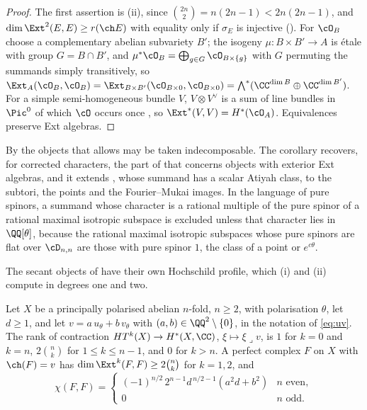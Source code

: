 \begin{proof}
The first assertion is (ii), since
$\binom{2n}{2}=n(2n-1)<2n(2n-1)$, and $\dim\Ext^{2}(E,E)\ge r(\ch E)$ with
equality only if $\sigma_{E}$ is injective (). For
$\cO_{B}$ choose a complementary abelian subvariety $B'$; the isogeny
$\mu\colon B\times B'\to A$ is \'etale with group $G=B\cap B'$, and
$\mu^{*}\cO_{B}=\bigoplus_{g\in G}\cO_{B\times\{g\}}$ with $G$ permuting the
summands simply transitively, so $\Ext_{A}(\cO_{B},\cO_{B})
=\Ext_{B\times B'}(\cO_{B\times0},\cO_{B\times0})=\bigwedge^{*}(\CC^{\dim B}
\oplus\CC^{\dim B'})$. For a simple semi-homogeneous bundle $V$,
$V\otimes V^{\vee}$ is a sum of line bundles in $\Pic^{0}$ of which $\cO$ occurs
once \cite{Muk78}, so $\Ext^{*}(V,V)=H^{*}(\cO_{A})$. Equivalences preserve
Ext algebras.
\end{proof}

By  the objects that 
allows may be taken indecomposable. The corollary recovers, for
corrected characters, the part of  that concerns objects with
exterior Ext algebras, and it extends , whose summand
has a scalar Atiyah class, to the subtori, the points and the Fourier--Mukai
images. In the language of pure spinors, a summand whose
character is a rational multiple of the pure spinor of a rational maximal
isotropic subspace is excluded unless that character lies in $\QQ[\theta]$,
because the rational maximal isotropic subspaces whose pure spinors are flat
over $\cD_{n,n}$ are those with pure spinor $1$, the class of a point or
$e^{c\theta}$.

The secant objects of  have their own Hochschild
profile, which (i) and (ii) compute in degrees one and two.

\begin{proposition}
\label{prop:secantprofile}
Let $X$ be a principally polarised abelian $n$-fold, $n\ge2$, with
polarisation $\theta$, let $d\ge1$, and let $v=a\,u_{\theta}+b\,v_{\theta}$
with $(a,b)\in\QQ^{2}\setminus\{0\}$, in the notation of \eqref{eq:uv}. The
rank of contraction $HT^{k}(X)\to H^{*}(X,\CC)$, $\xi\mapsto\xi\lrcorner v$, is
$1$ for $k=0$ and $k=n$, $2\binom{n}{k}$ for $1\le k\le n-1$, and $0$ for
$k>n$. A perfect complex $F$ on $X$ with $\ch(F)=v$ has
$\dim\Ext^{k}(F,F)\ge2\binom{n}{k}$ for $k=1,2$, and
\[
  \chi(F,F)=\begin{cases}
    (-1)^{n/2}\,2^{n-1}d^{\,n/2-1}(a^{2}d+b^{2}) & n\text{ even},\\
    0 & n\text{ odd}.
  \end{cases}
\]
\end{proposition}

